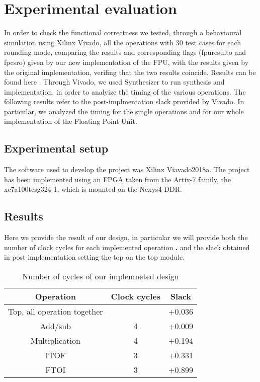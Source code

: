 \section{Experimental evaluation}
In order to check the functional correctness we tested, through a behavioural simulation using Xilinx Vivado, all the operations with 30 test cases for each rounding mode, comparing the results and corresponding flags (fpu\textunderscore result\textunderscore o and fpcsr\textunderscore o) given by our new implementation of the FPU, with the results given by the original implementation, verifing that the two results coincide. Results can be found here \cite{mor1kxtest}.
Through Vivado, we used Synthesizer to run synthesis and implementation, in order to analyize the timing of the various operations. The following results refer to the post-implmentation slack provided by Vivado. In particular, we analyzed the timing for the single operations and for our whole implementation of the Floating Point Unit.

\subsection{Experimental setup}
The software used to develop the project was Xilinx Viavado2018a.
The project has been implemented using an FPGA taken from the Artix-7 family, the xc7a100tcsg324-1, which is mounted on the Nexys4-DDR.

\subsection{Results}
Here we provide the result of our design, in particular we will provide both the number of clock cycles for each implemented operation \textbf{.} and the slack obtained in post-implementation setting the top on the top module.


\begin{table}
\small
\begin{center}
\caption{Number of cycles of our implemneted design}

\begin{tabular}{@{}|c|c|c|@{}}
\toprule
\textbf{Operation}& \textbf{Clock cycles} & \textbf{Slack } \\ \midrule
Top, all operation together &              & +0.036 \\ \midrule
Add/sub                     & 4            & +0.009 \\ \midrule
Multiplication              & 4            & +0.194 \\ \midrule
ITOF                        & 3            & +0.331 \\ \midrule
FTOI                        & 3            & +0.899 \\ \bottomrule
\end{tabular}
  \label{tab:clockCycles}
\end{center}
\end{table}

